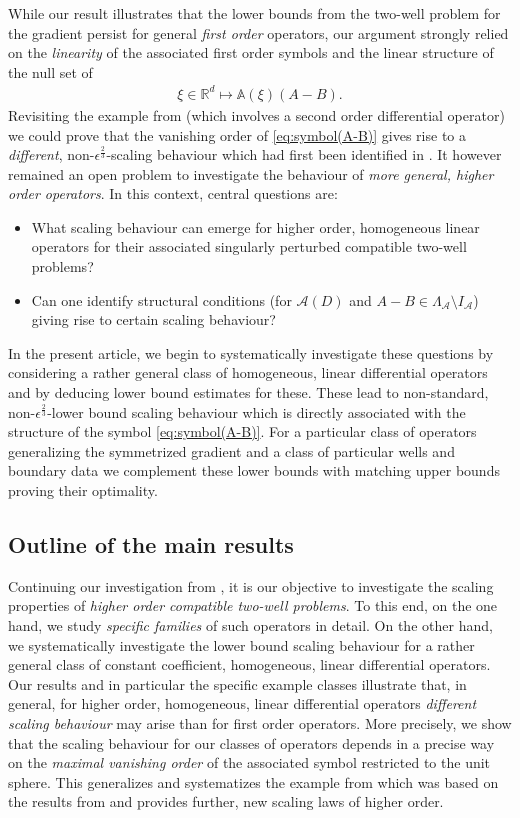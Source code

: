 \documentclass[a4paper, 10pt, twoside, notitlepage]{amsart}
\theoremstyle{plain}
\newcommand{\R}{\mathbb{R}}
\newcommand{\A}{\mathcal{A}}
\renewcommand{\AA}{\mathbb{A}}
\begin{document}
	
	While our result illustrates that the lower bounds from the two-well problem for the gradient persist for general \emph{first order} operators, our argument strongly relied on the \emph{linearity} of the associated first order symbols and the linear structure of the null set of
	\begin{align}\label{eq:symbol(A-B)}
		\xi\in\R^{d}\mapsto \AA(\xi)(A-B).
	\end{align}
	 Revisiting the example from \cite{CC15} (which involves a second order differential operator) we could prove
	that the vanishing order of \cref{eq:symbol(A-B)} gives rise to a \emph{different}, non-$\epsilon^{\frac{2}{3}}$-scaling behaviour which had first been identified in \cite{CC15}.  It however remained
	an open problem to investigate the behaviour of \emph{more general, higher order operators}.  In this context, central questions are:
	\begin{itemize}
		\item[(Q1)] What scaling behaviour can emerge for higher order, homogeneous linear operators for their associated singularly perturbed compatible two-well problems?
		\item[(Q2)] Can one identify structural conditions (for $\A(D)$ and $A-B \in \Lambda_{\A}\setminus I_{\A}$) giving rise to certain scaling behaviour?
	\end{itemize}
	In the present article, we begin to systematically investigate these questions by considering a rather general class of homogeneous, linear differential operators and by deducing lower bound
	estimates for these.  These lead to non-standard, non-$\epsilon^{\frac{2}{3}}$-lower bound scaling behaviour which is directly associated with the structure of the symbol \cref{eq:symbol(A-B)}. For a particular class of operators generalizing the symmetrized gradient and a class of particular wells and boundary data we complement these
	lower bounds with matching upper bounds proving their optimality.
	
	
	\subsection{Outline of the main results}
	\label{sec:main}
	Continuing our investigation from \cite{RRT23}, it is our objective to investigate the scaling properties of \emph{higher order compatible two-well problems}. To this end, on the one hand, we
	study \emph{specific families} of such operators in detail. On the other hand, we systematically investigate the lower bound scaling behaviour for a rather general class of constant coefficient,
	homogeneous, linear differential operators.  Our results and in particular the specific example classes illustrate that, in general, for higher order, homogeneous, linear differential
	operators \emph{different scaling behaviour} may arise than for first order operators. More precisely, we show that the scaling behaviour for our classes of operators depends in a precise way
	on the \emph{maximal vanishing order} of the associated symbol restricted to the unit sphere. This generalizes and systematizes the example from \cite[Section 3.5]{RRT23} which was based on the results from \cite{CC15} and provides
	further, new scaling laws of higher order.
	
\end{document}
